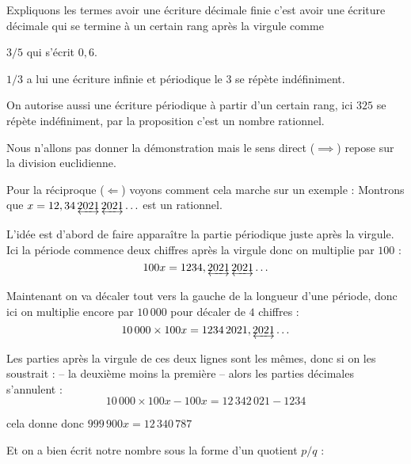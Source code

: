 \change

Expliquons les termes avoir une écriture décimale finie c'est avoir une écriture
décimale qui se termine à un certain rang après la virgule comme

$3/5$ qui s'écrit $0,6$.

\change

$1/3$ a lui une écriture infinie et périodique le $3$ se répète indéfiniment.

\change

On autorise aussi une écriture périodique à partir d'un certain rang, 
ici $325$ se répète indéfiniment, par la proposition c'est un nombre rationnel.


\change

Nous n'allons pas donner la démonstration mais le sens direct ($\implies$) repose
sur la division euclidienne.


Pour la réciproque ($\Longleftarrow$) voyons comment cela marche sur un exemple :
Montrons que $x = 12,34\,\underleftrightarrow{2021}\,\underleftrightarrow{2021}\ldots$ est un rationnel.



\change

L'idée est d'abord de faire apparaître la partie périodique juste après la virgule.
Ici la période commence deux chiffres après la virgule donc on multiplie par $100$ :
\begin{equation}
\label{eq:per1}
100x = 1234,\underleftrightarrow{2021}\,\underleftrightarrow{2021}\ldots
\end{equation}

\change

Maintenant on va décaler tout vers la gauche de la longueur d'une période, 
donc ici on multiplie encore par $10\,000$ pour décaler de $4$ chiffres :
\begin{equation}
\label{eq:per2} 
10\,000 \times 100  x = 1234 \, 2021,\underleftrightarrow{2021}\ldots
\end{equation}

\change

Les parties après la virgule de ces deux lignes 
sont les mêmes, donc si on les soustrait : -- la deuxième moins la première --
alors les parties décimales s'annulent :
$$10\,000 \times 100 x-100x=12\,342\,021-1234$$

\change

cela donne donc $999\,900x=12\,340\,787$ 


\change

Et on a bien écrit notre nombre sous la forme d'un quotient $p/q$ :

